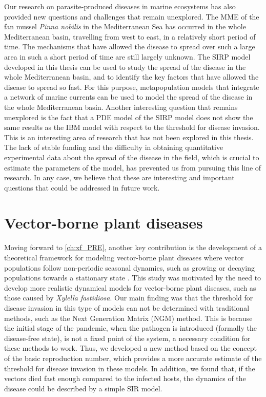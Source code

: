 Our research on parasite-produced diseases in marine ecosystems has also
provided new questions and challenges that remain unexplored. The MME of the
fan mussel \textit{Pinna nobilis} in the Mediterranean Sea has occurred
in the whole Mediterranean basin, travelling from west to east, in a relatively
short period of time. The mechanisms that have allowed the disease to spread
over such a large area in such a short period of time are still largely
unknown. The SIRP model developed in this thesis can be used to study the
spread of the disease in the whole Mediterranean basin, and to identify the key
factors that have allowed the disease to spread so fast. For this purpose,
metapopulation models that integrate a network of marine currents can be used
to model the spread of the disease in the whole Mediterranean basin. Another
interesting question that remains unexplored is the fact that a PDE model of
the SIRP model does not show the same results as the IBM model with respect to
the threshold for disease invasion. This is an interesting area of research
that has not been explored in this thesis. The lack of stable funding and
the difficulty in obtaining quantitative experimental data about the spread
of the disease in the field, which is crucial to estimate the parameters of the
model, has prevented us from pursuing this line of research. In any case, we
believe that these are interesting and important questions that could be
addressed in future work.

\section{Vector-borne plant diseases}

Moving forward to \cref{ch:xf_PRE}, another key contribution is the
development of a theoretical framework for modeling vector-borne plant diseases
where vector populations follow non-periodic seasonal dynamics, such as growing
or decaying populations towards a stationary state
\cite{GimenezRomero2022_PRE}. This study was motivated by the need to develop
more realistic dynamical models for vector-borne plant diseases, such as those
caused by \textit{Xylella fastidiosa}. Our main finding was that the threshold
for disease invasion in this type of models can not be determined with
traditional methods, such as the Next Generation Matrix (NGM) method. This is
because the initial stage of the pandemic, when the pathogen is introduced
(formally the disease-free state), is not a fixed point of the system, a
necessary condition for these methods to work. Thus, we developed a
new method based on the concept of the basic reproduction number, which
provides a more accurate estimate of the threshold for disease invasion in
these models. In addition, we found that, if the vectors died fast enough
compared to the infected hosts, the dynamics of the disease could be described
by a simple SIR model.

